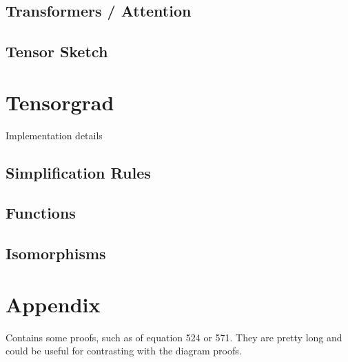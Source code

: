 \documentclass[oneside]{book}
\begin{document}
\section{Transformers / Attention}

\section{Tensor Sketch}

\chapter{Tensorgrad}

Implementation details

\section{Simplification Rules}
\section{Functions}
\section{Isomorphisms}

\chapter{Appendix}
Contains some proofs, such as of equation 524 or 571.
They are pretty long and could be useful for contrasting with the diagram proofs.
\end{document}
